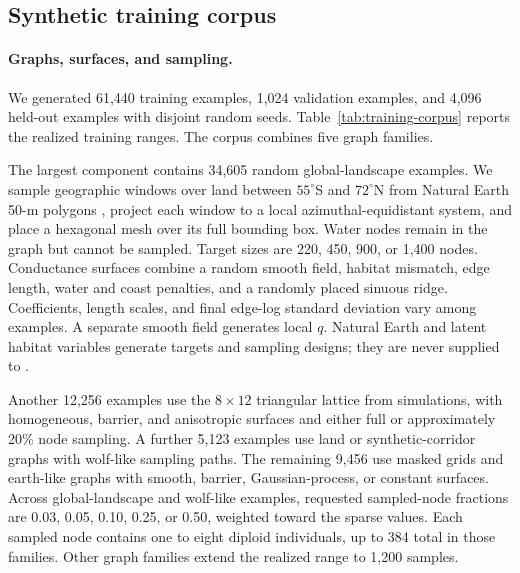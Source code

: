 \subsection{Synthetic training corpus}

\paragraph{Graphs, surfaces, and sampling.}
We generated 61,440 training examples, 1,024 validation examples, and 4,096
held-out examples with disjoint random seeds. Table~\ref{tab:training-corpus}
reports the realized training ranges. The corpus combines five graph families.

The largest component contains 34,605 random global-landscape examples. We
sample geographic windows over land between $55^\circ$S and $72^\circ$N from
Natural Earth 50-m polygons \citep{naturalearth}, project each window to a
local azimuthal-equidistant system, and place a hexagonal mesh over its full
bounding box. Water nodes remain in the graph but cannot be sampled. Target
sizes are 220, 450, 900, or 1,400 nodes. Conductance surfaces combine a random
smooth field, habitat mismatch, edge length, water and coast penalties, and a
randomly placed sinuous ridge. Coefficients, length scales, and final edge-log
standard deviation vary among examples. A separate smooth field generates
local $q$. Natural Earth and latent habitat variables generate targets and
sampling designs; they are never supplied to \dreems.

Another 12,256 examples use the $8\times12$ triangular lattice from \feems
simulations, with homogeneous, barrier, and anisotropic surfaces and either
full or approximately 20\% node sampling. A further 5,123 examples use land
or synthetic-corridor graphs with wolf-like sampling paths. The remaining
9,456 use masked grids and earth-like graphs with smooth, barrier,
Gaussian-process, or constant surfaces. Across global-landscape and wolf-like
examples, requested sampled-node fractions are 0.03, 0.05, 0.10, 0.25, or
0.50, weighted toward the sparse values. Each sampled node contains one to
eight diploid individuals, up to 384 total in those families. Other graph
families extend the realized range to 1,200 samples.

\begin{table}[t]
\centering
\caption{Realized production training corpus. Counts refer to graphs, not
SNPs.}
\label{tab:training-corpus}
\small

\end{table}

